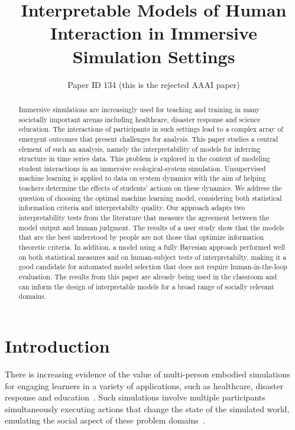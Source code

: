 \documentclass[letterpaper]{article}
\title{Interpretable Models of Human Interaction in Immersive Simulation Settings}
\author{Paper ID 134 (this is the rejected AAAI paper)}
\begin{document}
\maketitle


\begin{abstract}
Immersive simulations are increasingly used for teaching and training in many societally important arenas including healthcare, disaster response and science education.
The interactions of participants in such settings lead to a complex array of emergent  outcomes that present challenges for analysis.
This paper studies a central element of such an analysis, namely the interpretability of models for inferring structure in time series data.
This problem is explored in the context of modeling student interactions in an immersive ecological-system simulation.
Unsupervised machine learning is applied to data on system dynamics with the aim of helping teachers determine the effects of students' actions on these dynamics.
We address the question of choosing the optimal machine learning model, considering both statistical information criteria and interpretabilty quality.
Our approach adapts two interpretability tests from the literature that measure the agreement between the model output and human judgment.
The results of a user study show that the models that are  the best understood by  people are not those that optimize information theoretic criteria.
In addition, a model using a fully Bayesian approach performed well on both statistical measures and on human-subject tests of interpretabilty, making it a good candidate for automated model selection that does not require human-in-the-loop evaluation.
The results from this paper are already being used in the classroom and can inform the design of interpretable models for a broad range of socially relevant domains.
\end{abstract}



\section{Introduction}
\label{sec:introduction}
There is increasing evidence of the value of multi-person embodied simulations for engaging learners in a variety of
applications, such as healthcare, disaster response and education~\cite{alinier2014immersive,amir2013plan}.
Such simulations involve multiple participants simultaneously executing actions that change the state of the simulated world, emulating the social aspect of these problem domains~\cite{smordal2012hybrid}.
\end{document}

